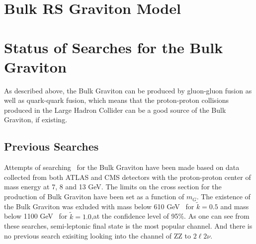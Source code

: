 \section{Bulk RS Graviton Model}


\section{Status of Searches for the Bulk Graviton}
As described above, the Bulk Graviton can be produced by gluon-gluon fusion as well as quark-quark fusion, which means that the proton-proton collisions produced in the Large Hadron Collider can be a good source of the Bulk Graviton, if existing. 
\subsection{Previous Searches}
Attempts of searching~\cite{Aad:2012nev,Aad:2013wxa,Aad:2014xka,Chatrchyan:2012baa,Khachatryan:2014gha,Aaboud:2016okv} for the Bulk Graviton have been made based on data collected from both ATLAS and CMS detectors with the proton-proton center of mass energy at 7, 8 and 13 GeV. The limits on the cross section for the production of Bulk Graviton have been set as a function of $m_{G}$. The existence of the Bulk Graviton was exluded with mass below 610 GeV~\cite{Chatrchyan:2012baa} for $\tilde{k}=0.5$ and mass below 1100 GeV~\cite{Aaboud:2016okv} for $\tilde{k}=1.0$,at the confidence level of 95\%. As one can see from these searches, semi-leptonic final state is the most popular channel. And there is no previous search exisiting looking into the channel of ZZ to $2\ell 2\nu$.

